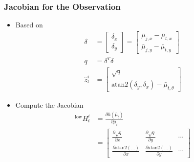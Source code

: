 \begin{frame}
    \frametitle{Jacobian for the Observation}

    \begin{itemize}
        \item Based on
        \begin{align*}
            \delta &= 
            \begin{bmatrix}
                \delta_x \\
                \delta_y
            \end{bmatrix}
            = \begin{bmatrix}
                \bar{\mu}_{j,x} - \bar{\mu}_{t,x} \\
                \bar{\mu}_{j,y} - \bar{\mu}_{t,y}
            \end{bmatrix}\\
            q &= \delta^T \delta\\
            \hat{z}^i_t &= 
            \begin{bmatrix}
                \sqrt{q} \\
                \text{atan2}(\delta_y, \delta_x) - \bar{\mu}_{t,\theta}
            \end{bmatrix}
        \end{align*}    
        \item Compute the Jacobian
        \begin{align*}
            {}^{\text{low}}H^i_t &= \frac{\partial h(\bar{\mu}_t)}{\partial \bar{\mu}_t}\\
            &= \begin{bmatrix}
                \frac{\partial \sqrt{q}}{\partial x} & \frac{\partial \sqrt{q}}{\partial y} & \cdots \\
                \frac{\partial \text{atan2}(\ldots)}{\partial x} & \frac{\partial \text{atan2}(\ldots)}{\partial y} & \cdots
            \end{bmatrix}
    \end{align*} 
    \end{itemize}

\end{frame}

